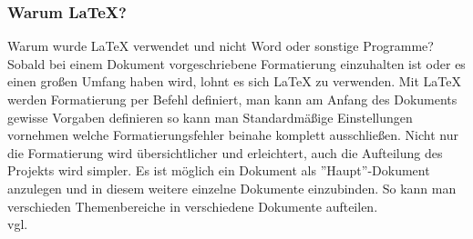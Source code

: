 \subsubsection{Warum LaTeX?}
\label{sec:WarumLaTeX} 
Warum wurde LaTeX verwendet und nicht Word oder sonstige Programme? Sobald bei einem Dokument vorgeschriebene Formatierung einzuhalten ist oder es einen großen Umfang haben wird, lohnt es sich LaTeX zu verwenden. Mit LaTeX werden Formatierung per Befehl definiert, man kann am Anfang des Dokuments gewisse Vorgaben definieren so kann man Standardmäßige Einstellungen vornehmen welche Formatierungsfehler beinahe komplett ausschließen. Nicht nur die Formatierung wird übersichtlicher und erleichtert, auch die Aufteilung des Projekts wird simpler. Es ist möglich ein Dokument als ''Haupt''-Dokument anzulegen und in diesem weitere einzelne Dokumente einzubinden. So kann man verschieden Themenbereiche in verschiedene Dokumente aufteilen. \\vgl. \cite{TechnologieLaTeX} 